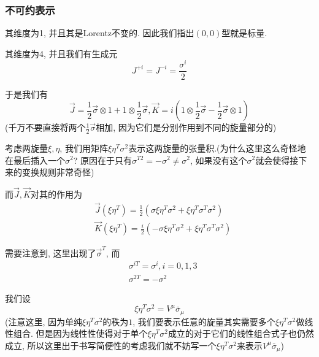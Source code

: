 \subsubsection{不可约表示}
\begin{example}[$(0, 0)$型]
    其维度为1, 并且其是Lorentz不变的. 因此我们指出$(0, 0)$型就是标量.
\end{example}
\begin{example}
    其维度为4, 并且我们有生成元
    \begin{equation}
        J^{+i}=J^{-i}=\frac{\sigma^i}2
    \end{equation}

    于是我们有
    \begin{equation}
        \vec J=\frac12\vec\sigma\otimes1+1\otimes\frac12\vec\sigma, \vec K=i\left(1\otimes\frac12\vec\sigma-\frac12\vec\sigma\otimes1\right)
    \end{equation}
    (千万不要直接将两个$\frac12\vec\sigma$相加, 因为它们是分别作用到不同的旋量部分的)

    考虑两旋量$\xi, \eta$, 我们用矩阵$\xi\eta^T\sigma^2$表示这两旋量的张量积.(为什么这里这么奇怪地在最后插入一个$\sigma^2$? 原因在于只有$\sigma^{T2}=-\sigma^2\neq\sigma^2$, 如果没有这个$\sigma^2$就会使得接下来的变换规则非常奇怪)

    而$\vec J, \vec K$对其的作用为
    \begin{align}
        & \vec J(\xi\eta^T)=\frac12(\sigma\xi\eta^T\sigma^2+\xi\eta^T\sigma^T\sigma^2)\\
        & \vec K(\xi\eta^T)=\frac i2(-\sigma\xi\eta^T\sigma^2+\xi\eta^T\sigma^T\sigma^2)
    \end{align}

    需要注意到, 这里出现了$\vec\sigma^T$, 而
    \begin{align}
       &\sigma^{iT}=\sigma^i, i=0,1,3\\
       &\sigma^{2T}=-\sigma^2
    \end{align}

    我们设
    \begin{equation}
        \xi\eta^T\sigma^2=V^\mu\bar\sigma_\mu
    \end{equation}
    (注意这里, 因为单纯$\xi\eta^T\sigma^2$的秩为$1$, 我们要表示任意的旋量其实需要多个$\xi\eta^T\sigma^2$做线性组合. 但是因为线性性使得对于单个$\xi\eta^T\sigma^2$成立的对于它们的线性组合式子也仍然成立, 所以这里出于书写简便性的考虑我们就不妨写一个$\xi\eta^T\sigma^2$来表示$V^\mu\bar\sigma_\mu$)


\end{example}
